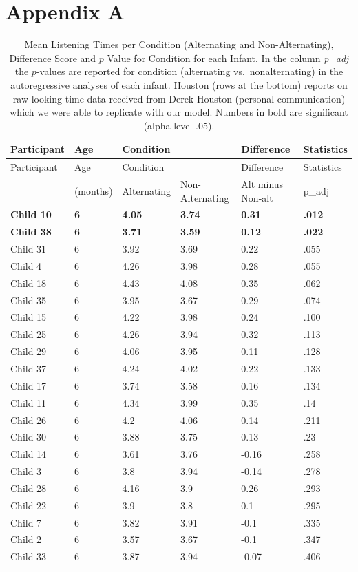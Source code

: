 \documentclass[openright,titlepage,12pt,a4paper]{book}
\begin{document}
\newpage

\hypertarget{ch05appendix}{%
\section*{Appendix A}\label{ch05appendix}}

\footnotesize

\begin{longtable}[]{@{}llllll@{}}
\caption{\label{tab:ch04tab5} Mean Listening Times per Condition (Alternating and Non-Alternating), Difference Score and \(p\) Value for Condition for each Infant. In the column \emph{p\_adj} the \(p\)-values are reported for condition (alternating vs.~nonalternating) in the autoregressive analyses of each infant. Houston (rows at the bottom) reports on raw looking time data received from Derek Houston (personal communication) which we were able to replicate with our model. Numbers in bold are significant (alpha level .05).}\tabularnewline
\toprule
Participant & Age & Condition & & Difference & Statistics\tabularnewline
\midrule
\endfirsthead
\toprule
Participant & Age & Condition & & Difference & Statistics\tabularnewline
\midrule
\endhead
& (months) & Alternating & Non-Alternating & Alt minus Non-alt & p\_adj\tabularnewline
\textbf{Child 10} & \textbf{6} & \textbf{4.05} & \textbf{3.74} & \textbf{0.31} & \textbf{.012}\tabularnewline
\textbf{Child 38} & \textbf{6} & \textbf{3.71} & \textbf{3.59} & \textbf{0.12} & \textbf{.022}\tabularnewline
Child 31 & 6 & 3.92 & 3.69 & 0.22 & .055\tabularnewline
Child 4 & 6 & 4.26 & 3.98 & 0.28 & .055\tabularnewline
Child 18 & 6 & 4.43 & 4.08 & 0.35 & .062\tabularnewline
Child 35 & 6 & 3.95 & 3.67 & 0.29 & .074\tabularnewline
Child 15 & 6 & 4.22 & 3.98 & 0.24 & .100\tabularnewline
Child 25 & 6 & 4.26 & 3.94 & 0.32 & .113\tabularnewline
Child 29 & 6 & 4.06 & 3.95 & 0.11 & .128\tabularnewline
Child 37 & 6 & 4.24 & 4.02 & 0.22 & .133\tabularnewline
Child 17 & 6 & 3.74 & 3.58 & 0.16 & .134\tabularnewline
Child 11 & 6 & 4.34 & 3.99 & 0.35 & .14\tabularnewline
Child 26 & 6 & 4.2 & 4.06 & 0.14 & .211\tabularnewline
Child 30 & 6 & 3.88 & 3.75 & 0.13 & .23\tabularnewline
Child 14 & 6 & 3.61 & 3.76 & -0.16 & .258\tabularnewline
Child 3 & 6 & 3.8 & 3.94 & -0.14 & .278\tabularnewline
Child 28 & 6 & 4.16 & 3.9 & 0.26 & .293\tabularnewline
Child 22 & 6 & 3.9 & 3.8 & 0.1 & .295\tabularnewline
Child 7 & 6 & 3.82 & 3.91 & -0.1 & .335\tabularnewline
Child 2 & 6 & 3.57 & 3.67 & -0.1 & .347\tabularnewline
Child 33 & 6 & 3.87 & 3.94 & -0.07 & .406\tabularnewline

\end{longtable}
\end{document}
